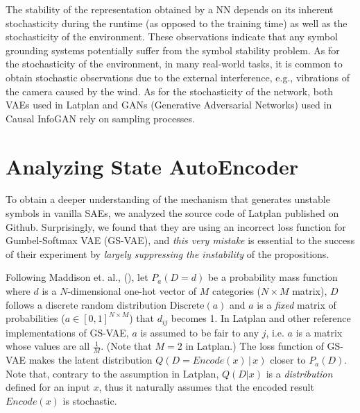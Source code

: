 
The stability of the representation obtained by a NN depends
on
its inherent stochasticity during the runtime (as opposed to the training time) as well as
the stochasticity of the environment.
% 
These observations indicate that any symbol grounding systems potentially suffer from 
the symbol stability problem.
% 
As for the stochasticity of the environment,
in many real-world tasks, it is common to obtain stochastic observations
due to the external interference, e.g., vibrations of the camera caused by the wind.
% 
As for the stochasticity of the network,
both
VAEs \cite{kingma2013auto,jang2016categorical,higgins2016beta} used in Latplan
and
GANs (Generative Adversarial Networks) \cite{goodfellow2014generative} used in Causal InfoGAN \cite{kurutach2018learning}
rely on sampling processes.

\section{Analyzing State AutoEncoder}
\label{analysis}

To obtain a deeper understanding of the mechanism that generates
unstable symbols in vanilla SAEs, we
analyzed the source code of Latplan published on Github.
% 
Surprisingly, we found that they are using an incorrect loss function for Gumbel-Softmax VAE (GS-VAE),
and \emph{this very mistake} is essential to the success of their experiment
by \emph{largely suppressing the instability} of the propositions.

 
Following Maddison et. al., (\citeyear[Appendix C.1]{MaddisonMT17}),
let $P_a(D=d)$ be a probability mass function where
$d$ is a $N$-dimensional one-hot vector of $M$ categories ($N\times M$ matrix),
$D$ follows a discrete random distribution $\text{Discrete}(a)$ and
$a$ is a \emph{fixed} matrix of probabilities ($a\in {[0,1]}^{N\times M}$)
that $d_{ij}$ becomes 1.
% 
In Latplan and other reference implementations \cite{ericjanggithub} of GS-VAE,
$a$ is assumed to be fair to any $j$,
i.e. $a$ is a matrix whose values are all $\frac{1}{M}$. (Note that $M=2$ in Latplan.)
The loss function of GS-VAE makes the latent distribution $Q(D=Encode(x)\, |\, x)$ closer to $P_a(D)$.
Note that, contrary to the assumption in Latplan,
$Q(D|x)$ is a \emph{distribution} defined for an input $x$,
thus it naturally assumes that the encoded result $Encode(x)$ is stochastic.

